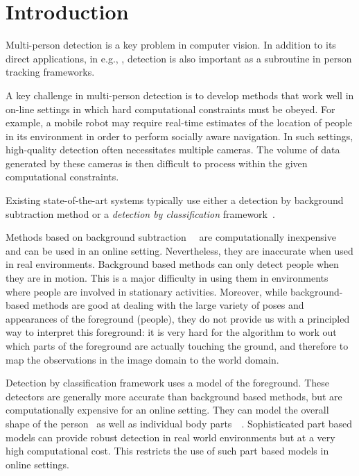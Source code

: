 \documentclass[10pt,twocolumn,letterpaper]{article}
\begin{document}
\section{Introduction}
Multi-person detection is a key problem in computer vision.  In addition to its direct applications, in e.g., , detection is also important as a subroutine in person tracking  frameworks.  

A key challenge in multi-person detection is to develop methods that work well in on-line settings in which hard computational constraints must be obeyed. For example, a mobile robot may require real-time  estimates of the location of people in its environment in order to perform socially aware navigation.  In such settings, high-quality detection often necessitates multiple cameras.  The volume of data generated by these cameras is then difficult to process within the given computational constraints.  

Existing state-of-the-art systems typically use either a  detection by background subtraction method or a \emph{detection by classification} framework~\cite{Pami-11}.

Methods based on background subtraction~\cite{bk1}~\cite{bk2-bayesian} are computationally inexpensive and can be used in an online setting. Nevertheless, they are inaccurate when used in real environments. Background based methods can only detect people when they are in motion. This is a major difficulty in using them in environments where people are involved in stationary activities. Moreover, while background-based methods are good at dealing with the large variety of poses and appearances of the foreground (people), they do not provide us with a principled way to interpret this foreground: it is very hard for the algorithm to work out which parts of the foreground are actually touching the ground, and therefore to map the observations in the image domain to the world domain.

Detection by classification framework uses a model of the foreground. These detectors are generally more accurate than background based methods, but are computationally expensive for an online setting. They can model the overall shape of the person~\cite{dalaltriggs} as well as individual body parts~\cite{DPM}~\cite{partsDeva}. Sophisticated part based models can provide robust detection in real world environments but at a very high computational cost. This restricts the use of such part based models in online settings.
\end{document}
